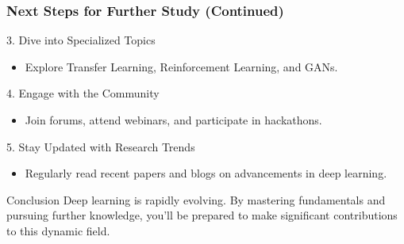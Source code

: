 \documentclass[aspectratio=169]{beamer}
\begin{document}
\begin{frame}[fragile]
  \frametitle{Next Steps for Further Study (Continued)}

  \begin{block}{3. Dive into Specialized Topics}
    \begin{itemize}
      \item Explore Transfer Learning, Reinforcement Learning, and GANs.
    \end{itemize}
  \end{block}

  \begin{block}{4. Engage with the Community}
    \begin{itemize}
      \item Join forums, attend webinars, and participate in hackathons.
    \end{itemize}
  \end{block}

  \begin{block}{5. Stay Updated with Research Trends}
    \begin{itemize}
      \item Regularly read recent papers and blogs on advancements in deep learning.
    \end{itemize}
  \end{block}

  \begin{block}{Conclusion}
    Deep learning is rapidly evolving. By mastering fundamentals and pursuing further knowledge, you'll be prepared to make significant contributions to this dynamic field.
  \end{block}
\end{frame}
\end{document}
